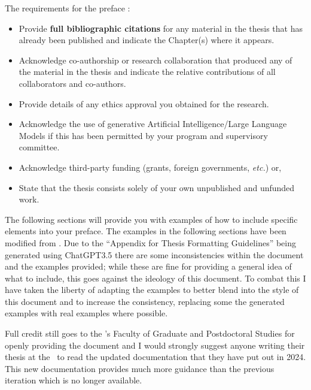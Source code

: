 		

		The requirements for the preface \cite{FGPS2025a}:
		\begin{itemize}
			\item Provide \textbf{full bibliographic citations} for any material in the thesis that has already been published and indicate the Chapter(s) where it appears.
			\item Acknowledge co-authorship or research collaboration that produced any of the material in the thesis and indicate the relative contributions of all collaborators and co-authors.
			\item Provide details of any ethics approval you obtained for the research.
			\item Acknowledge the use of generative Artificial Intelligence/Large Language Models if this has been permitted by your program and supervisory committee.
			\item Acknowledge third-party funding (grants, foreign governments, \textit{etc.}) or, 
			\item State that the thesis consists solely of your own unpublished and unfunded work.
		\end{itemize}

		The following sections will provide you with examples of how to include specific elements into your preface.
		The examples in the following sections have been modified from .
		Due to the \enquote{Appendix for Thesis Formatting Guidelines} being generated using ChatGPT3.5 there are some inconsistencies within the document and the examples provided; while these are fine for providing a general idea of what to include, this goes against the ideology of this document.
		To combat this I have taken the liberty of adapting the examples to better blend into the style of this document and to increase the consistency, replacing some the generated examples with real examples where possible.

		Full credit still goes to the \University's Faculty of Graduate and Postdoctoral Studies for openly providing the document and I would strongly suggest anyone writing their thesis at the \University\ to read the updated documentation that they have put out in 2024.
		This new documentation provides much more guidance than the previous iteration which is no longer available.

